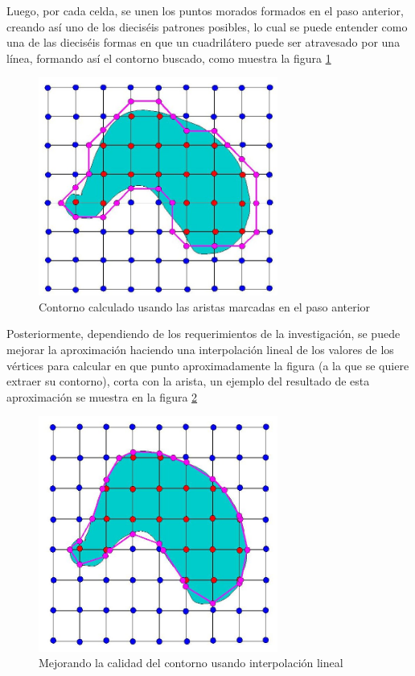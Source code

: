 Luego, por cada celda, se unen los puntos morados formados en el paso anterior, creando
así uno de los dieciséis patrones posibles, lo cual se puede entender como una de las dieciséis
formas en que un cuadrilátero puede ser atravesado por una línea, formando así el contorno
buscado, como muestra la figura \ref{f:estadoDelArte:connectedobj}

\begin{figure}
\centering
	\includegraphics[width=0.7\textwidth]{images/marchingsquare/connectedobj.jpg}
\caption{Contorno calculado usando las aristas marcadas en el paso anterior}
\label{f:estadoDelArte:connectedobj}
\end{figure}

Posteriormente, dependiendo de los requerimientos de la investigación, se puede mejorar
la aproximación haciendo una interpolación lineal de los valores de los vértices para calcular en
que punto aproximadamente la figura (a la que se quiere extraer su contorno), corta con la arista,
un ejemplo del resultado de esta aproximación se muestra en la figura \ref{f:estadoDelArte:2Dintersected}

\begin{figure}
\centering
	\includegraphics[width=0.7\textwidth]{images/marchingsquare/2Dintersected.jpg}
\caption{Mejorando la calidad del contorno usando interpolación lineal}
\label{f:estadoDelArte:2Dintersected}
\end{figure}


